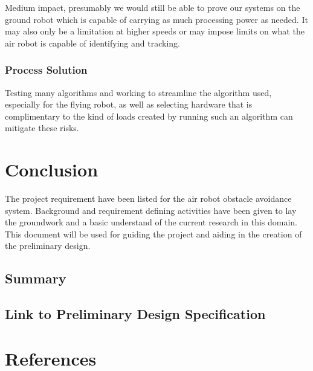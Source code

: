 \documentclass[]{report}
\begin{document}
Medium impact, presumably we would still be able to prove our systems on the ground robot which is capable of carrying as much processing power as needed. It may also only be a limitation at higher speeds or may impose limits on what the air robot is capable of identifying and tracking. 

\subsection{Process Solution}

Testing many algorithms and working to streamline the algorithm used, especially for the flying robot, as well as selecting hardware that is complimentary to the kind of loads created by running such an algorithm can mitigate these risks. 


\chapter{Conclusion}

The project requirement have been listed for the air robot obstacle avoidance system. Background and requirement defining activities have been given to lay the groundwork and a basic understand of the current research in this domain. This document will be used for guiding the project and aiding in the creation of the preliminary design. 

\section{Summary}

\section{Link to Preliminary Design Specification}

\chapter*{References}

\printbibliography
\end{document}
